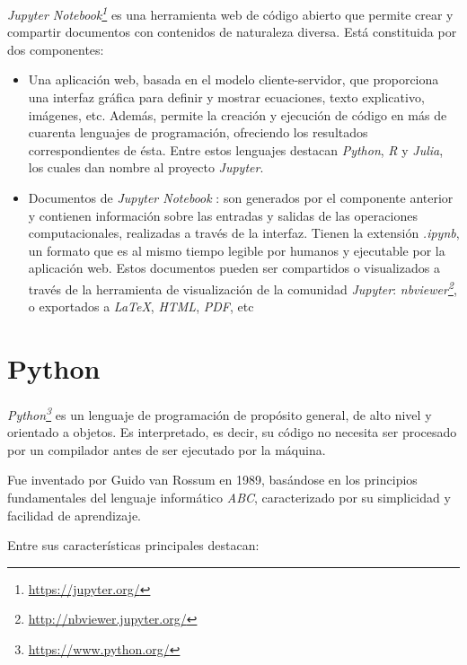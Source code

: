 \documentclass[a4paper, 12pt]{report}
\begin{document}
\textit{Jupyter Notebook\footnote{\url{https://jupyter.org/}}} es una herramienta web de código abierto que permite crear y compartir documentos con contenidos de naturaleza diversa. Está constituida por dos componentes:

\begin{itemize}
  \item  Una aplicación web, basada en el modelo cliente-servidor, que proporciona una interfaz gráfica
         para definir  y mostrar ecuaciones, texto explicativo, imágenes, etc. Además, permite la creación y ejecución de código en más de cuarenta lenguajes de programación, ofreciendo los resultados  correspondientes de ésta. Entre estos lenguajes destacan \textit{Python}, \textit{R} y \textit{Julia}, los cuales dan nombre al proyecto \textit{Jupyter}.
  \item Documentos de \textit{Jupyter Notebook} : son generados por el componente anterior y  contienen  información  sobre las entradas y salidas de  las operaciones computacionales, realizadas a través       de la interfaz. Tienen la extensión \textit{.ipynb}, un formato que es al mismo tiempo legible por humanos y ejecutable por la aplicación web. Estos documentos pueden ser  compartidos o visualizados a través de la herramienta de visualización de la comunidad \textit{Jupyter}: \textit{nbviewer\footnote{\url{http://nbviewer.jupyter.org/}}}, o exportados a \textit{LaTeX}, \textit{HTML}, \textit{PDF}, etc
\end{itemize}

\section{Python}
\label{sec:python}

\textit{Python\footnote{\url{https://www.python.org/}}} es un lenguaje de programación de propósito general, de alto nivel y orientado a objetos. Es  interpretado, es decir,  su código no necesita ser procesado por un compilador antes de ser ejecutado por la máquina.

Fue inventado por Guido van Rossum en 1989, basándose en los principios fundamentales del lenguaje informático \textit{ABC}, caracterizado por su simplicidad y facilidad de aprendizaje.

Entre sus características principales destacan:
\end{document}
